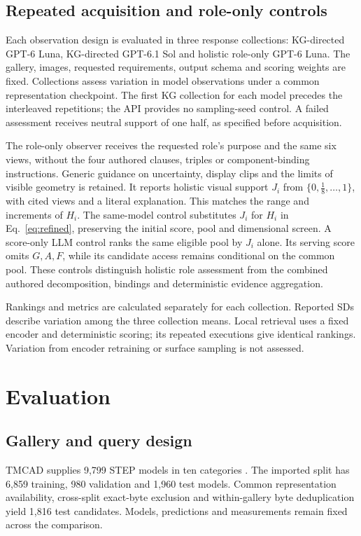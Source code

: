 \documentclass[10pt,a4paper,twocolumn]{article}
\begin{document}
\subsection{Repeated acquisition and role-only controls}

Each observation design is evaluated in three response collections: KG-directed
GPT-6 Luna, KG-directed GPT-6.1 Sol and holistic role-only GPT-6 Luna. The gallery,
images, requested requirements, output schema and scoring weights are fixed.
Collections assess variation in model observations under a common representation
checkpoint. The first KG collection for each model precedes the interleaved
repetitions; the API provides no sampling-seed control. A failed assessment
receives neutral support of one half, as specified before acquisition.

The role-only observer receives the requested role's purpose and the same six views,
without the four authored clauses, triples or component-binding instructions.
Generic guidance on uncertainty, display clips and the limits of visible geometry
is retained. It reports holistic visual support $J_i$ from
$\{0,\frac18,\ldots,1\}$, with cited views and a literal explanation. This matches
the range and increments of $H_i$. The same-model control substitutes $J_i$ for
$H_i$ in Eq.~\ref{eq:refined}, preserving the initial score, pool and dimensional
screen. A score-only LLM control ranks the same eligible pool by $J_i$ alone.
Its serving score omits $G,A,F$, while its candidate access remains conditional
on the common pool. These controls distinguish holistic role assessment from the
combined authored decomposition, bindings and deterministic evidence aggregation.

Rankings and metrics are calculated separately for each collection. Reported
SDs describe variation among the three collection means. Local retrieval uses a
fixed encoder and deterministic scoring; its repeated executions give identical
rankings. Variation from encoder retraining or surface sampling is not assessed.

\section{Evaluation}

\subsection{Gallery and query design}

TMCAD supplies 9,799 STEP models in ten categories \cite{zou2025brt}. The imported split has 6,859 training, 980 validation and 1,960 test models. Common representation availability, cross-split exact-byte exclusion and within-gallery byte deduplication yield 1,816 test candidates. Models, predictions and measurements remain fixed across the comparison.
\end{document}
